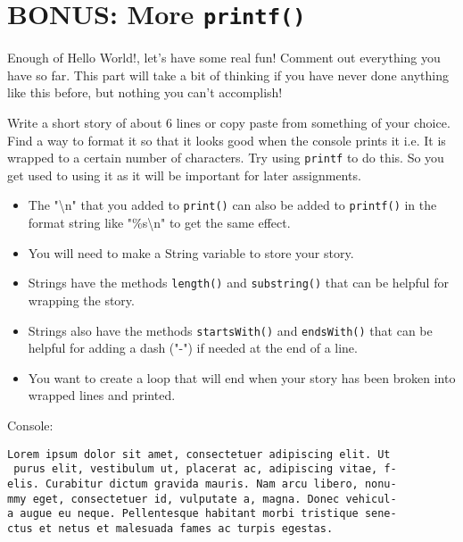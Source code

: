 \documentclass{report}
\begin{document}
\section{BONUS: More \texttt{printf()}}

Enough of Hello World!, let's have some real fun! Comment out everything you have so far. This part will take a bit of thinking if you have never done anything like this before, but nothing you can't accomplish!

Write a short story of about 6 lines or copy paste from something of your choice. Find a way to format it so that it looks good when the console prints it i.e. It is wrapped to a certain number of characters. Try using \texttt{printf} to do this. So you get used to using it as it will be important for later assignments.

\begin{itemize}
\item The "\textbackslash n" that you added to \texttt{print()} can also be added to \texttt{printf()} in the format string like "\%s\textbackslash n" to get the same effect.
\item You will need to make a String variable to store your story.
\item Strings have the methods \texttt{length()} and \texttt{substring()} that can be helpful for wrapping the story.
\item Strings also have the methods \texttt{startsWith()} and \texttt{endsWith()} that can be helpful for adding a dash ("-") if needed at the end of a line.
\item You want to create a loop that will end when your story has been broken into wrapped lines and printed.
\end{itemize}

Console:
\begin{lstlisting}
Lorem ipsum dolor sit amet, consectetuer adipiscing elit. Ut
 purus elit, vestibulum ut, placerat ac, adipiscing vitae, f-
elis. Curabitur dictum gravida mauris. Nam arcu libero, nonu-
mmy eget, consectetuer id, vulputate a, magna. Donec vehicul-
a augue eu neque. Pellentesque habitant morbi tristique sene-
ctus et netus et malesuada fames ac turpis egestas.
\end{lstlisting}
\end{document}
